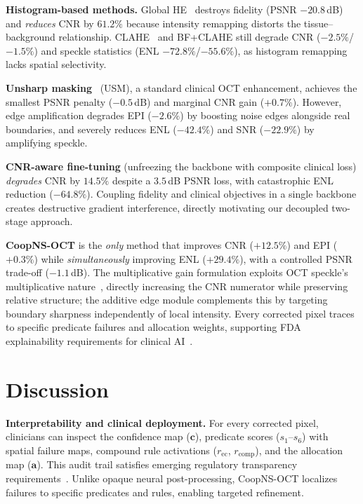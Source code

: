 \documentclass[journal,twoside,web]{ieeecolor}
\begin{document}
\textbf{Histogram-based methods.} Global HE~\cite{gonzalez2018digital} destroys fidelity (PSNR $-20.8$\,dB) and \emph{reduces} CNR by $61.2\%$ because intensity remapping distorts the tissue--background relationship. CLAHE~\cite{zuiderveld1994clahe} and BF+CLAHE still degrade CNR ($-2.5\%$/$-1.5\%$) and speckle statistics (ENL $-72.8\%$/$-55.6\%$), as histogram remapping lacks spatial selectivity.

\textbf{Unsharp masking}~\cite{polesel2000image} (USM), a standard clinical OCT enhancement, achieves the smallest PSNR penalty ($-0.5$\,dB) and marginal CNR gain ($+0.7\%$). However, edge amplification degrades EPI ($-2.6\%$) by boosting noise edges alongside real boundaries, and severely reduces ENL ($-42.4\%$) and SNR ($-22.9\%$) by amplifying speckle.

\textbf{CNR-aware fine-tuning} (unfreezing the backbone with composite clinical loss) \emph{degrades} CNR by $14.5\%$ despite a $3.5$\,dB PSNR loss, with catastrophic ENL reduction ($-64.8\%$). Coupling fidelity and clinical objectives in a single backbone creates destructive gradient interference, directly motivating our decoupled two-stage approach.

\textbf{CoopNS-OCT} is the \emph{only} method that improves CNR ($+12.5\%$) and EPI ($+0.3\%$) while \emph{simultaneously} improving ENL ($+29.4\%$), with a controlled PSNR trade-off ($-1.1$\,dB). The multiplicative gain formulation exploits OCT speckle's multiplicative nature~\cite{goodman2007speckle}, directly increasing the CNR numerator while preserving relative structure; the additive edge module complements this by targeting boundary sharpness independently of local intensity. Every corrected pixel traces to specific predicate failures and allocation weights, supporting FDA explainability requirements for clinical AI~\cite{fdaaiml2021}.

\section{Discussion}
\label{sec:discussion}

\textbf{Interpretability and clinical deployment.}
For every corrected pixel, clinicians can inspect the confidence map ($\mathbf{c}$), predicate scores ($s_1$--$s_6$) with spatial failure maps, compound rule activations ($r_\text{ec}$, $r_\text{comp}$), and the allocation map ($\mathbf{a}$). This audit trail satisfies emerging regulatory transparency requirements~\cite{fdaaiml2021}. Unlike opaque neural post-processing, CoopNS-OCT localizes failures to specific predicates and rules, enabling targeted refinement.
\end{document}
